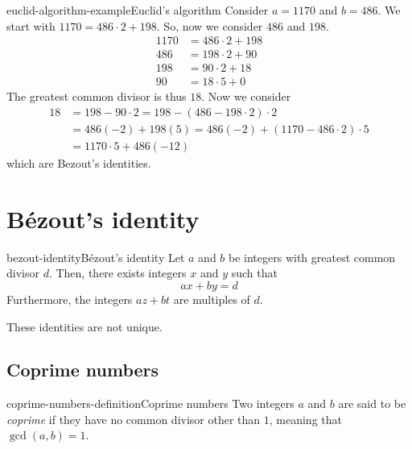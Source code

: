 \documentclass[preview]{standalone}
\begin{document}
\begin{snippetexample}{euclid-algorithm-example}{Euclid's algorithm}
    Consider \(a=1170\) and \(b=486\).
    We start with
    \(1170 = 486 \cdot 2 + 198\). So, now we consider \(486\) and \(198\).
    \begin{align*}
        1170 &= 486 \cdot 2 + 198 \\
        486 &= 198 \cdot 2 + 90 \\
        198 &= 90 \cdot 2 + 18 \\
        90 &= 18 \cdot 5 + 0
    \end{align*}
    The greatest common divisor is thus \(18\).
    Now we consider
    \begin{align*}
        18 &= 198 - 90\cdot 2 = 198 - (486 - 198 \cdot 2)\cdot 2 \\
        &= 486(-2) + 198(5) = 486(-2) + (1170 - 486\cdot 2) \cdot 5 \\
        &= 1170 \cdot 5 + 486(-12)
    \end{align*}
    which are Bezout's identities.
\end{snippetexample}

\section{Bézout's identity}

\begin{snippettheorem}{bezout-identity}{Bézout's identity}
    Let \(a\) and \(b\) be integers with greatest common divisor \(d\).
    Then, there exists integers \(x\) and \(y\) such that
    \[
        ax+by=d
    \]
    Furthermore, the integers \(az+bt\) are multiples of \(d\).
\end{snippettheorem}

\begin{plainhtml}
    These identities are not unique.
\end{plainhtml}

\subsection{Coprime numbers}

\begin{snippetdefinition}{coprime-numbers-definition}{Coprime numbers}
    Two integers \(a\) and \(b\) are said to be \textit{coprime}
    if they have no common divisor other than \(1\), meaning that \(\gcd(a,b)=1\).
\end{snippetdefinition}
\end{document}
